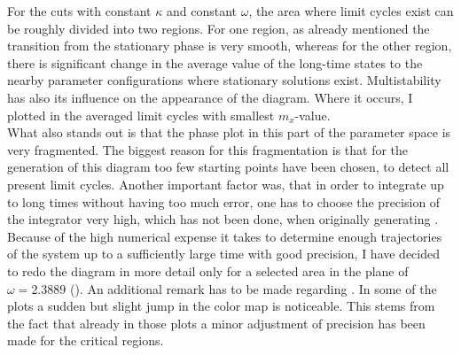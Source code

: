 For the cuts with constant $\kappa$ and constant $\omega$, the area where limit cycles exist can be roughly divided into two regions. For one region, as already mentioned the transition from the stationary phase is very smooth, whereas for the other region, there is significant change in the average value of the long-time states to the nearby parameter configurations where stationary solutions exist. Multistability has also its influence on the appearance of the diagram. Where it occurs, I plotted in  the averaged limit cycles with smallest $m_x$-value. \\What also stands out is that the phase plot in this part of the parameter space is very fragmented. The biggest reason for this fragmentation is that for the generation of this diagram too few starting points have been chosen, to detect all present limit cycles. Another important factor was, that in order to integrate up to long times without having too much error, one has to choose the precision of the integrator very high, which has not been done, when originally generating . \\Because of the high numerical expense it takes to determine enough trajectories of the system up to a sufficiently large time with good precision, I have decided to redo the diagram in more detail only for a selected area in the plane of $\omega=2.3889$ (). An additional remark has to be made regarding . In some of the plots a sudden but slight jump in the color map is noticeable. This stems from the fact that already in those plots a minor adjustment of precision has been made for the critical regions. %
